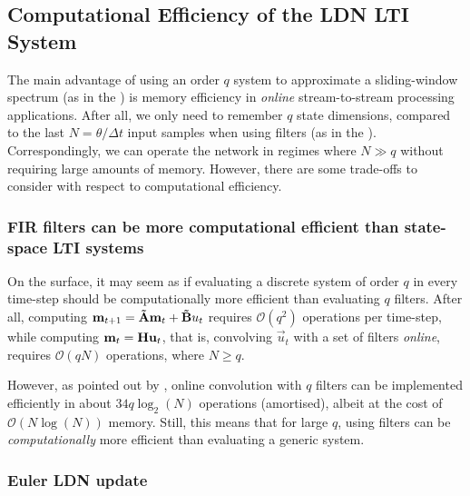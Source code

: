 \subsection{Computational Efficiency of the LDN LTI System}
\label{sec:ldn_computational_efficiency}

The main advantage of using an order $q$ \LTI system to approximate a sliding-window spectrum (as in the \LRGF \LMU) is memory efficiency in \emph{online} stream-to-stream processing applications.
After all, we only need to remember $q$ state dimensions, compared to the last $N = \theta / \Delta t$ input samples when using \FIR filters (as in the \FIR \LMU).
Correspondingly, we can operate the network in regimes where $N \gg q$ without requiring large amounts of memory.
However, there are some trade-offs to consider with respect to computational efficiency.

\subsubsection{FIR filters can be more computational efficient than state-space LTI systems}
On the surface, it may seem as if evaluating a discrete \LTI system of order $q$ in every time-step should be computationally more efficient than evaluating $q$ \FIR filters.
After all, computing $\mathbf{m}_{t + 1} = \mathbf{\tilde A} \mathbf{m}_t + \mathbf{\tilde B} u_t$ requires $\mathcal{O}(q^2)$ operations per time-step, while computing $\mathbf{m}_t = \mathbf{H} \mathbf{u}_t$, that is, convolving $\vec u_t$ with a set of \FIR filters \emph{online}, requires $\mathcal{O}(qN)$ operations, where $N \geq q$.

However, as pointed out by \citet{gardner1995efficient}, online convolution with $q$ \FIR filters can be implemented efficiently in about $34 q \log_2(N)$ operations (amortised), albeit at the cost of $\mathcal{O}(N \log(N))$ memory.
Still, this means that for large $q$, using \FIR filters can be \emph{computationally} more efficient than evaluating a generic \LTI system.

\subsubsection{Euler LDN update}

